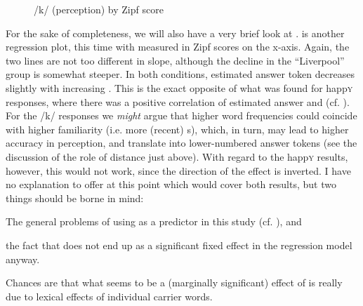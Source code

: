 \begin{figure}[b]
	
		\resizebox{.49\linewidth}{!}{} 
	\caption{/k/ (perception) by Zipf score}
	\label{fig.scatter.k.ext.zipf}
\end{figure}

For the sake of completeness, we will also have a very brief look at .
 is another regression plot, this time with  measured in Zipf scores on the x-axis.
Again, the two lines are not too different in slope, although the decline in the ``Liverpool'' group is somewhat steeper.
In both  conditions, estimated answer token decreases slightly with increasing .
This is the exact opposite of what was found for happ\textsc{y} responses, where there was a positive correlation of estimated answer and  (cf. ).
For the /k/ responses we \emph{might} argue that higher word frequencies could coincide with higher familiarity (i.e. more (recent) s), which, in turn, may lead to higher accuracy in perception, and translate into lower-numbered answer tokens (see the discussion of the role of distance just above).
With regard to the happ\textsc{y} results, however, this would not work, since the direction of the effect is inverted.
I have no explanation to offer at this point which would cover both results, but two things should be borne in mind:
\begin{inparaenum}[(a)]
	\item The general problems of using  as a predictor in this study (cf. ), and
	\item the fact that  does not end up as a significant fixed effect in the regression model anyway.
\end{inparaenum}
Chances are that what seems to be a (marginally significant) effect of  is really due to lexical effects of individual carrier words.